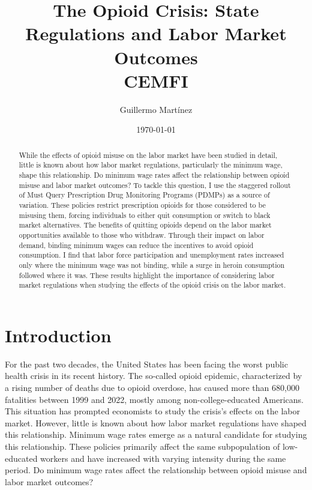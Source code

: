 \documentclass[12pt,a4paper]{article}
\title{The Opioid Crisis: State Regulations and Labor Market Outcomes \\
[2ex] \large CEMFI}
\author{Guillermo Martínez}
\date{\today}
\begin{document}
\maketitle

\begin{abstract}
    \noindent
    While the effects of opioid misuse on the labor market have been studied in detail, little is known about how labor market regulations, particularly the minimum wage, shape this relationship. Do minimum wage rates affect the relationship between opioid misuse and labor market outcomes? To tackle this question, I use the staggered rollout of Must Query Prescription Drug Monitoring Programs (PDMPs) as a source of variation. These policies restrict prescription opioids for those considered to be misusing them, forcing individuals to either quit consumption or switch to black market alternatives. The benefits of quitting opioids depend on the labor market opportunities available to those who withdraw. Through their impact on labor demand, binding minimum wages can reduce the incentives to avoid opioid consumption. I find that labor force participation and unemployment rates increased only where the minimum wage was not binding, while a surge in heroin consumption followed where it was. These results highlight the importance of considering labor market regulations when studying the effects of the opioid crisis on the labor market.
\end{abstract}


\newpage

\section*{Introduction}

For the past two decades, the United States has been facing the worst public health crisis in its recent history.
The so-called opioid epidemic, characterized by a rising number of deaths due to opioid overdose, has caused more than 680,000 fatalities between 1999 and 2022, mostly among non-college-educated Americans.
This situation has prompted economists to study the crisis's effects on the labor market.
However, little is known about how labor market regulations have shaped this relationship.
Minimum wage rates emerge as a natural candidate for studying this relationship.
These policies primarily affect the same subpopulation of low-educated workers and have increased with varying intensity during the same period.
Do minimum wage rates affect the relationship between opioid misuse and labor market outcomes?
\end{document}
